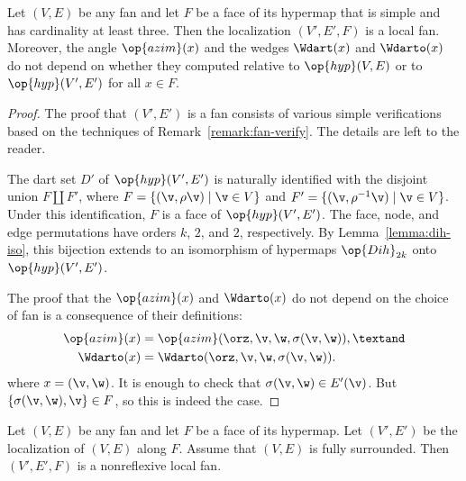 \begin{lemma}[localization]%
\label{lemma:localization}
Let $(V,E)$ be any fan and let $F$ be a face of its hypermap that is
simple and has cardinality at least three.  Then the localization
$(V',E',F)$ is a local fan.  Moreover, the angle $\op{azim}(x)$ and
the wedges $\Wdart(x)$ and $\Wdarto(x)$ do not depend on whether they
computed relative to $\op{hyp}(V,E)$ or to $\op{hyp}(V',E')$ for all
$x\in F$.
\end{lemma}



\begin{proof}
The proof that $(V',E')$ is a fan consists of various simple
verifications based on the techniques of
Remark~\ref{remark:fan-verify}.  The details are left to the reader.

The dart set $D'$ of $\op{hyp}(V',E')$ is naturally identified with
the disjoint union $F\coprod F'$, where $F = \{(\v,\rho\v) \mid \v\in
V\}$ and $F'=\{(\v,\rho^{-1}\v) \mid \v\in V\}$.  Under this
identification, $F$ is a face of $\op{hyp}(V',E')$.  The face, node,
and edge permutations have orders $k$, $2$, and $2$, respectively.  By
Lemma~\ref{lemma:dih-iso}, this bijection extends to an isomorphism of
hypermaps $\op{Dih}_{2k}$ onto $\op{hyp}(V',E')$.

The proof that the $\op{azim}(x)$ and $\Wdarto(x)$ do not depend on the
choice of fan is a consequence of their definitions:
\begin{align*}
\op{azim}(x) &= \op{azim}(\orz,\v,\w,\sigma(\v,\w)),\textand \\
\Wdarto(x) &= \Wdarto(\orz,\v,\w,\sigma(\v,\w)).\\
\end{align*}
where $x = (\v,\w)$.  It is enough to check that $\sigma(\v,\w)\in
E'(\v)$.  But $\{\sigma(\v,\w),\v\}\in F$, so this is indeed the case.
\end{proof}

\begin{lemma}[]\cutrate{}\label{lemma:localize-nonreflexive} 
Let $(V,E)$ be any fan and
  let $F$ be a face of its hypermap.  Let $(V',E')$ be the
  localization of $(V,E)$ along $F$.  Assume that $(V,E)$ is fully surrounded.
  Then $(V',E',F)$ is a nonreflexive local fan.
\end{lemma}

